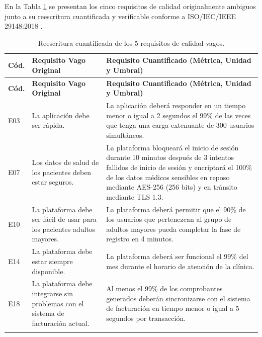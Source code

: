 \documentclass[10pt,a4paper]{article}
\begin{document}
	En la Tabla \ref{tab:cuantificacion} se presentan los cinco requisitos de calidad originalmente ambiguos junto a su reescritura cuantificada y verificable conforme a ISO/IEC/IEEE 29148:2018 \cite{ieee29148}.
	
	\small
	\begin{longtable}{@{}p{1.0cm}p{5.5cm}p{9.0cm}@{}}
		\caption{Reescritura cuantificada de los 5 requisitos de calidad vagos.} \label{tab:cuantificacion} \\
		\toprule
		\textbf{Cód.} & \textbf{Requisito Vago Original} & \textbf{Requisito Cuantificado (Métrica, Unidad y Umbral)} \\
		\midrule
		\endfirsthead
		\toprule
		\textbf{Cód.} & \textbf{Requisito Vago Original} & \textbf{Requisito Cuantificado (Métrica, Unidad y Umbral)} \\
		\midrule
		\endhead
		\bottomrule
		\endfoot
		
		E03 & La aplicación debe ser rápida. & La aplicación deberá responder en un tiempo menor o igual a 2 segundos el 99\% de las veces que tenga una carga extenuante de 300 usuarios simultáneos. \\ \addlinespace
		
		E07 & Los datos de salud de los pacientes deben estar seguros. & La plataforma bloqueará el inicio de sesión durante 10 minutos después de 3 intentos fallidos de inicio de sesión y encriptará el 100\% de los datos médicos sensibles en reposo mediante AES-256 (256 bits) y en tránsito mediante TLS 1.3. \\ \addlinespace
		
		E10 & La plataforma debe ser fácil de usar para los pacientes adultos mayores. & La plataforma deberá permitir que el 90\% de los usuarios que pertenezcan al grupo de adultos mayores pueda completar la fase de registro en 4 minutos. \\ \addlinespace
		
		E14 & La plataforma debe estar siempre disponible. & La plataforma deberá ser funcional el 99\% del mes durante el horario de atención de la clínica. \\ \addlinespace
		
		E18 & La plataforma debe integrarse sin problemas con el sistema de facturación actual. & Al menos el 99\% de los comprobantes generados deberán sincronizarse con el sistema de facturación en tiempo menor o igual a 5 segundos por transacción. \\ \addlinespace
		
	\end{longtable}
	\normalsize
	
\end{document}
